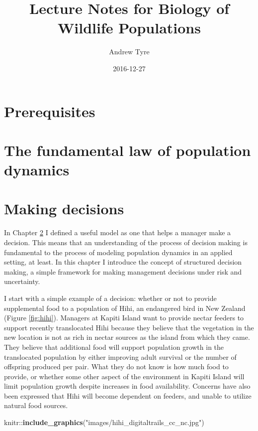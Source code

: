 \documentclass[]{book}
\title{Lecture Notes for Biology of Wildlife Populations}
\author{Andrew Tyre}
\date{2016-12-27}
\newenvironment{Shaded}{\begin{snugshade}}{\end{snugshade}}
\newcommand{\KeywordTok}[1]{\textcolor[rgb]{0.13,0.29,0.53}{\textbf{{#1}}}}
\newcommand{\StringTok}[1]{\textcolor[rgb]{0.31,0.60,0.02}{{#1}}}
\newcommand{\NormalTok}[1]{{#1}}
\begin{document}
\maketitle

{
\setcounter{tocdepth}{1}
\tableofcontents
}
\chapter{Prerequisites}\label{prerequisites}

\chapter{The fundamental law of population
dynamics}\label{chap:fundamental}

\chapter{Making decisions}\label{chap:sdm}

In Chapter \ref{chap:fundamental} I defined a useful model as one that
helps a manager make a decision. This means that an understanding of the
process of decision making is fundamental to the process of modeling
population dynamics in an applied setting, at least. In this chapter I
introduce the concept of structured decision making, a simple framework
for making management decisions under risk and uncertainty.

I start with a simple example of a decision: whether or not to provide
supplemental food to a population of Hihi, an endangered bird in New
Zealand (Figure \ref{fig:hihi}). Managers at Kapiti Island want to
provide nectar feeders to support recently translocated Hihi because
they believe that the vegetation in the new location is not as rich in
nectar sources as the island from which they came. They believe that
additional food will support population growth in the translocated
population by either improving adult survival or the number of offspring
produced per pair. What they do not know is how much food to provide, or
whether some other aspect of the environment in Kapiti Island will limit
population growth despite increases in food availability. Concerns have
also been expressed that Hihi will become dependent on feeders, and
unable to utilize natural food sources.

\begin{Shaded}
\begin{Highlighting}[]
\NormalTok{knitr::}\KeywordTok{include_graphics}\NormalTok{(}\StringTok{"images/hihi_digitaltrails_cc_nc.jpg"}\NormalTok{)}
\end{Highlighting}
\end{Shaded}
\end{document}
